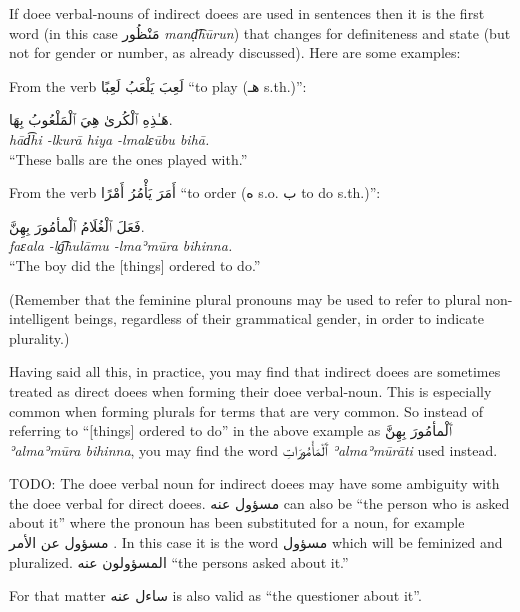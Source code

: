 \documentclass[
  10pt,
]{book}
\begin{document}
If doee verbal-nouns of indirect doees are used in sentences then it is the first word (in this case \foreignlanguage{arabic}{مَنْظُور} \emph{manḍ͡hūrun}) that changes for definiteness and state (but not for gender or number, as already discussed). Here are some examples:

From the verb \foreignlanguage{arabic}{لَعِبَ يَلْعَبُ لَعِبًا} \enquote{to play (\foreignlanguage{arabic}{هـ} s.th.)}:

\foreignlanguage{arabic}{هَـٰذِهِ ٱلْکُرىٰ هِيَ ٱلْمَلْعُوبُ بِهَا.}\\
\emph{hād͡hi -lkurā hiya -lmalɛūbu bihā.}\\
\enquote{These balls are the ones played with.}

From the verb \foreignlanguage{arabic}{أَمَرَ يَأْمُرُ أَمْرًا} \enquote{to order (\foreignlanguage{arabic}{ه} s.o. \foreignlanguage{arabic}{ب} to do s.th.)}:

\foreignlanguage{arabic}{فَعَلَ ٱلْغُلَامُ ٱلْمأمُورَ بِهِنَّ.}\\
\emph{faɛala -lg͡hulāmu -lmaʾmūra bihinna.}\\
\enquote{The boy did the {[}things{]} ordered to do.}

(Remember that the feminine plural pronouns may be used to refer to plural non-intelligent beings, regardless of their grammatical gender, in order to indicate plurality.)

Having said all this, in practice, you may find that indirect doees are sometimes treated as direct doees when forming their doee verbal-noun. This is especially common when forming plurals for terms that are very common. So instead of referring to \enquote{{[}things{]} ordered to do} in the above example as
\foreignlanguage{arabic}{ٱَلْمأمُورَ بِهِنَّ}
\emph{ʾalmaʾmūra bihinna}, you may find the word \foreignlanguage{arabic}{ٱَلْمَأْمُورَاتِ} \emph{ʾalmaʾmūrāti} used instead.

TODO: The doee verbal noun for indirect doees may have some ambiguity with the doee verbal for direct doees. \foreignlanguage{arabic}{مسؤول عنه} can also be \enquote{the person who is asked about it} where the pronoun has been substituted for a noun, for example \foreignlanguage{arabic}{مسؤول عن الأمر} . In this case it is the word \foreignlanguage{arabic}{مسؤول} which will be feminized and pluralized. \foreignlanguage{arabic}{المسؤولون عنه} \enquote{the persons asked about it.}

For that matter \foreignlanguage{arabic}{ساءل عنه} is also valid as \enquote{the questioner about it}.
\end{document}
